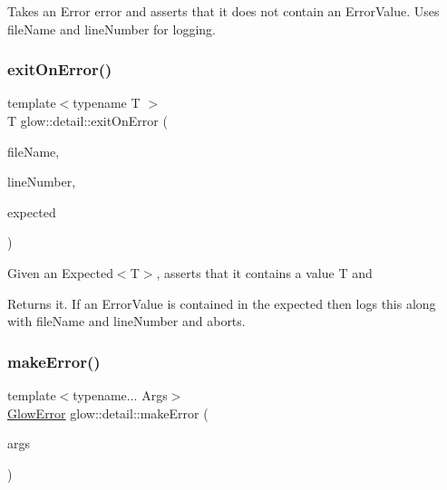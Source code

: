 Takes an Error {\ttfamily error} and asserts that it does not contain an Error\+Value. Uses {\ttfamily file\+Name} and {\ttfamily line\+Number} for logging. \mbox{\label{namespaceglow_1_1detail_a2f258d44dd2a51bcbd37c3fa7ab163c7}} 
\subsubsection{\texorpdfstring{exit\+On\+Error()}{exitOnError()}\hspace{0.1cm}{\footnotesize\ttfamily [2/2]}}
{\footnotesize\ttfamily template$<$typename T $>$ \\
T glow\+::detail\+::exit\+On\+Error (\begin{DoxyParamCaption}\item[{const char $\ast$}]{file\+Name,  }\item[{size\+\_\+t}]{line\+Number,  }\item[{\hyperlink{classglow_1_1detail_1_1_glow_expected}{Glow\+Expected}$<$ T $>$}]{expected }\end{DoxyParamCaption})}

Given an Expected$<$\+T$>$, asserts that it contains a value T and \begin{DoxyReturn}{Returns}
it. If an Error\+Value is contained in the expected then logs this along with {\ttfamily file\+Name} and {\ttfamily line\+Number} and aborts. 
\end{DoxyReturn}
\mbox{\label{namespaceglow_1_1detail_a21cb777b3cd78edbd6dc1531606590db}} 
\subsubsection{\texorpdfstring{make\+Error()}{makeError()}}
{\footnotesize\ttfamily template$<$typename... Args$>$ \\
\hyperlink{classglow_1_1detail_1_1_glow_error}{Glow\+Error} glow\+::detail\+::make\+Error (\begin{DoxyParamCaption}\item[{Args \&\&...}]{args }\end{DoxyParamCaption})}

